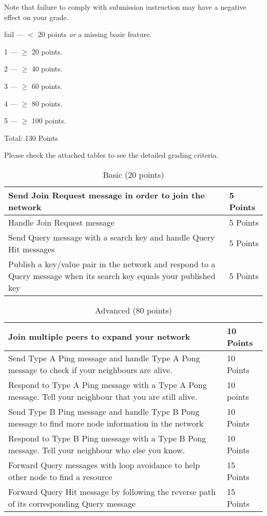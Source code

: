 \documentclass[12pt, a4paper]{article}
\begin{document}
Note that failure to comply with submission instruction may have a negative effect on your grade.

\vskip 20pt

fail --- $<$ 20 points \emph{or} a missing basic feature.

1 --- $\ge$ 20 points.

2 --- $\ge$  40 points.

3 --- $\ge$ 60 points.

4 --- $\ge$ 80 points.

5 --- $\ge$  100 points.

\vskip 20pt

Total: 130 Points

Please check the attached tables to see the detailed grading criteria.

\begin{table}[htdp]
\caption{Basic (20 points)}
\begin{center}
\begin{tabular}{|p{12cm}|p{2cm}|}
\hline
Send Join Request message in order to join the network & 5 Points \\
\hline
Handle Join Request message & 5 Points\\
\hline
Send Query message with a search key and handle Query Hit messages & 5 Points  \\
\hline
Publish a key/value pair in the network and respond to a Query message when its search key equals your published key & 5 Points \\
\hline
\end{tabular}
\end{center}
\end{table}

\begin{table}[htdp]
\caption{Advanced (80 points)}
\begin{center}
\begin{tabular}{|p{12cm}|p{2cm}|}
\hline
Join multiple peers to expand your network & 10 Points \\
\hline
Send Type A Ping message and handle Type A Pong message to check if your neighbours are alive. & 10 Points \\
\hline
Respond to Type A Ping message with a Type A Pong message.
Tell your neighbour that you are still alive. & 10 points \\
\hline
Send Type B Ping message and handle Type B Pong message to find more node information in the network & 10 Points \\
\hline
Respond to Type B Ping message with a Type B Pong message.
Tell your neighbour who else you know. & 10 Points \\
\hline
Forward Query messages with loop avoidance to help other node to find a resource & 15 Points \\
\hline
Forward Query Hit message by following the reverse path of its corresponding Query message & 15 Points \\
\hline
\end{tabular}
\end{center}
\end{table}
\end{document}
